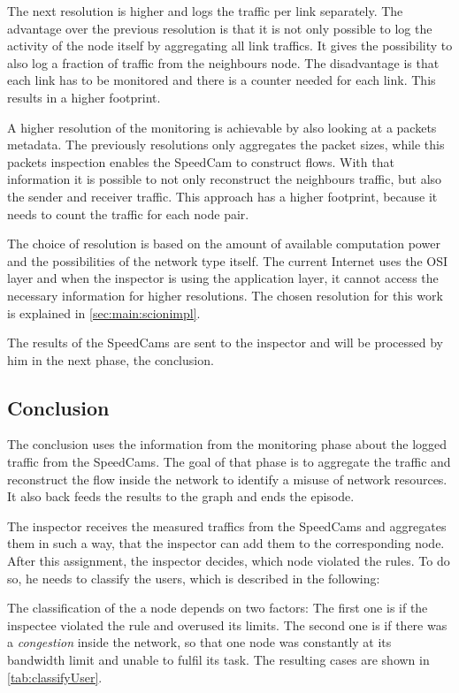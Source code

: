 \documentclass[thesis.tex]{subfiles}
\begin{document}
The next resolution is higher and logs the traffic per link separately. The advantage over the previous resolution is that it is not only possible to log the activity of the node itself by aggregating all link traffics. It gives the possibility to also log a fraction of traffic from the neighbours node. The disadvantage is that each link has to be monitored and there is a counter needed for each link. This results in a higher footprint.

A higher resolution of the monitoring is achievable by also looking at a packets metadata. The previously resolutions only aggregates the packet sizes, while this packets inspection enables the SpeedCam to construct flows. With that information it is possible to not only reconstruct the neighbours traffic, but also the sender and receiver traffic. This approach has a higher footprint, because it needs to count the traffic for each node pair.

The choice of resolution is based on the amount of available computation power and the possibilities of the network type itself. The current Internet uses the OSI layer  and when the inspector is using the application layer, it cannot access the necessary information for higher resolutions. The chosen resolution for this work is explained in \autoref{sec:main:scionimpl}.

The results of the SpeedCams are sent to the inspector and will be processed by him in the next phase, the conclusion.

\subsection{Conclusion} \label{sec:main:conclusionphase}
The conclusion uses the information from the monitoring phase about the logged traffic from the SpeedCams. The goal of that phase is to aggregate the traffic and reconstruct the flow inside the network to identify a misuse of network resources. It also back feeds the results to the graph and ends the episode.

The inspector receives the measured traffics from the SpeedCams and aggregates them in such a way, that the inspector can add them to the corresponding node. After this assignment, the inspector decides, which node violated the rules. To do so, he needs to classify the users, which is described in the following:

The classification of the a node depends on two factors: The first one is if the inspectee violated the rule and overused its limits. The second one is if there was a \textit{congestion} inside the network, so that one node was constantly at its bandwidth limit and unable to fulfil its task. The resulting cases are shown in \autoref{tab:classifyUser}.
\end{document}
